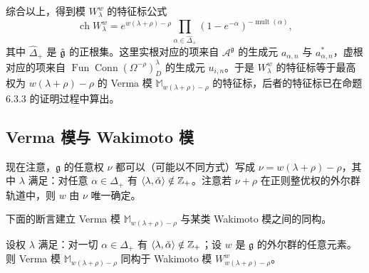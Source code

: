 
综合以上，得到模 $W^w_\lambda$ 的特征标公式
\begin{equation}
    \operatorname{ch}W^w_\lambda
    =e^{w(\lambda+\rho)-\rho}\prod_{\alpha\in\hat\Delta_+}(1-e^{-\alpha})^{-\operatorname{mult}(\alpha)},
    \tag{9.5-4}
\end{equation}
其中 $\hat\Delta_+$ 是 $\hat{\mathfrak{g}}$ 的正根集。这里实根对应的项来自 $\mathcal{A}^{\mathfrak{g}}$ 的生成元 $a_{\alpha,n}$ 与 $a^*_{\alpha,n}$，虚根对应的项来自 $\operatorname{Fun}\operatorname{Conn}(\Omega^{-\rho})^\lambda_D$ 的生成元 $u_{i,n}$。于是 $W^w_\lambda$ 的特征标等于最高权为 $w(\lambda+\rho)-\rho$ 的 Verma 模 $\mathbb{M}_{w(\lambda+\rho)-\rho}$ 的特征标，后者的特征标已在命题 6.3.3 的证明过程中算出。

\subsection{Verma 模与 Wakimoto 模}

现在注意，$\mathfrak{g}$ 的任意权 $\nu$ 都可以（可能以不同方式）写成 $\nu=w(\lambda+\rho)-\rho$，其中 $\lambda$ 满足：对任意 $\alpha\in\Delta_+$ 有 $\langle\lambda,\check\alpha\rangle\notin\mathbb{Z}_+$。注意若 $\nu+\rho$ 在正则整优权的外尔群轨道中，则 $w$ 由 $\nu$ 唯一确定。

下面的断言建立 Verma 模 $\mathbb{M}_{w(\lambda+\rho)-\rho}$ 与某类 Wakimoto 模之间的同构。

\begin{proposition}
    设权 $\lambda$ 满足：对一切 $\alpha\in\Delta_+$ 有 $\langle\lambda,\check\alpha\rangle\notin\mathbb{Z}_+$；设 $w$ 是 $\mathfrak{g}$ 的外尔群的任意元素。则 Verma 模 $\mathbb{M}_{w(\lambda+\rho)-\rho}$ 同构于 Wakimoto 模 $W^w_{w(\lambda+\rho)-\rho}$。
\end{proposition}

